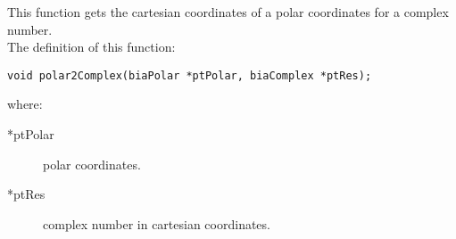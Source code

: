 This function gets the cartesian coordinates of a polar coordinates for a complex number.\\

The definition of this function:
%
\begin{verbatim}
void polar2Complex(biaPolar *ptPolar, biaComplex *ptRes);  
\end{verbatim}
%
where:
%
\begin{description}
\item[*ptPolar] polar coordinates.
\item[*ptRes] complex number in cartesian coordinates.
\end{description}

